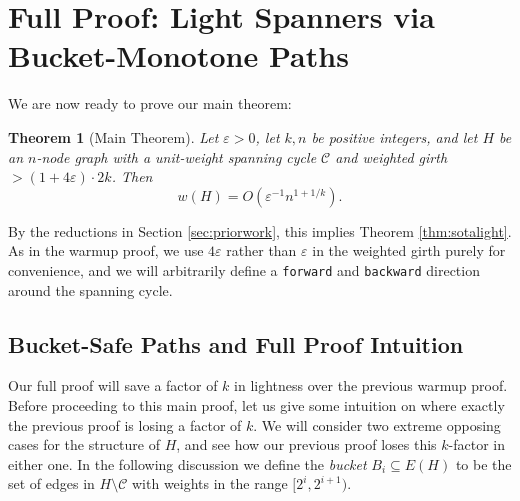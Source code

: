 \documentclass{article}\usepackage[a4paper,margin=20mm]{geometry}
\newtheorem{theorem}{Theorem}\newtheorem{lemma}[theorem]{Lemma}\newtheorem{proposition}[theorem]{Proposition}\newtheorem{corollary}[theorem]{Corollary}\newtheorem{definition}[theorem]{Definition}\newtheorem{claim}[theorem]{Claim}\newtheorem{remark}[theorem]{Remark}\newtheorem{observation}[theorem]{Observation}\newtheorem{conjecture}[theorem]{Conjecture}\newtheorem{example}[theorem]{Example}
\newcommand{\eps}{\varepsilon}
\newcommand{\cee}{\mathcal{C}}
\newcommand{\forward}{\texttt{forward}}
\newcommand{\backward}{\texttt{backward}}
\begin{document}


\section{Full Proof: Light Spanners via Bucket-Monotone Paths \label{sec:mainproof}}

We are now ready to prove our main theorem:

\begin{theorem} [Main Theorem] \label{thm:main}
Let $\eps>0$, let $k, n$ be positive integers, and let $H$ be an $n$-node graph with a unit-weight spanning cycle $\cee$ and weighted girth $>(1+4 \eps) \cdot 2k$.
Then
$$w(H) = O\left( \eps^{-1} n^{1+1/k} \right).$$
\end{theorem}

By the reductions in Section \ref{sec:priorwork}, this implies Theorem \ref{thm:sotalight}.
As in the warmup proof, we use $4\eps$ rather than $\eps$ in the weighted girth purely for convenience, and we will arbitrarily define a \forward{} and \backward{} direction around the spanning cycle.

\subsection{Bucket-Safe Paths and Full Proof Intuition}

Our full proof will save a factor of $k$ in lightness over the previous warmup proof.
Before proceeding to this main proof, let us give some intuition on where exactly the previous proof is losing a factor of $k$.
We will consider two extreme opposing cases for the structure of $H$, and see how our previous proof loses this $k$-factor in either one.
In the following discussion we define the \emph{bucket} $B_i \subseteq E(H)$ to be the set of edges in $H \setminus \cee$ with weights in the range $[2^i, 2^{i+1})$.
\end{document}
